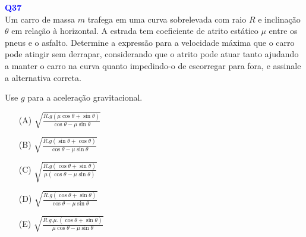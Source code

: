 \documentclass[a4paper,12pt]{article}
\begin{document}
\begin{flushleft}
\textbf{\textcolor{blue}{\Large Q37}}\\

Um carro de massa \( m \) trafega em uma curva sobrelevada com raio \( R \) e inclinação \(\theta\) em relação à horizontal. 
A estrada tem coeficiente de atrito estático \(\mu\) entre os pneus e o asfalto. Determine a expressão para a velocidade 
máxima que o carro pode atingir sem derrapar, considerando que o atrito pode atuar tanto ajudando a manter o carro na curva 
quanto impedindo-o de escorregar para fora, e assinale a alternativa correta.

Use \( g \) para a aceleração gravitacional.

\begin{itemize}
\item[(A)] $\sqrt{\frac{R.g\left(\mu\cos\theta +\sin\theta\right)}{\cos\theta - \mu\sin\theta}}$
\item[(B)] $\sqrt{\frac{R.g\left(\sin\theta + \cos\theta\right)}{\cos\theta - \mu\sin\theta}}$  
\item[(C)] $\sqrt{\frac{R.g\left(\cos\theta +\sin\theta\right)}{\mu\left(\cos\theta - \mu\sin\theta\right)}}$
\item[(D)] $\sqrt{\frac{R.g\left(\cos\theta +\sin\theta\right)}{\cos\theta - \mu\sin\theta}}$
\item[(E)] $\sqrt{\frac{R.g.\mu.\left(\cos\theta +\sin\theta\right)}{\mu\cos\theta - \mu\sin\theta}}$
\end{itemize}

\vspace{0.5cm}

\end{flushleft}
\end{document}

